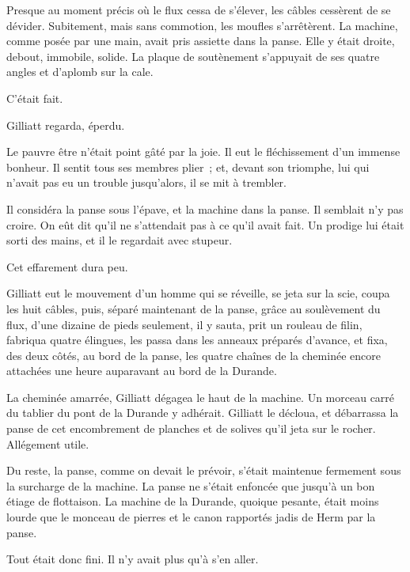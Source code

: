 \documentclass[french,twoside]{book} %
\begin{document}
Presque au moment précis où le flux cessa de s’élever, les câbles cessèrent de se dévider. Subitement, mais sans commotion, les moufles s’arrêtèrent. La machine, comme posée par une main, avait pris assiette dans la panse. Elle y était droite, debout, immobile, solide. La plaque de soutènement s’appuyait de ses quatre angles et d’aplomb sur la cale.\par
 C’était fait.\par
Gilliatt regarda, éperdu.\par
Le pauvre être n’était point gâté par la joie. Il eut le fléchissement d’un immense bonheur. Il sentit tous ses membres plier ; et, devant son triomphe, lui qui n’avait pas eu un trouble jusqu’alors, il se mit à trembler.\par
Il considéra la panse sous l’épave, et la machine dans la panse. Il semblait n’y pas croire. On eût dit qu’il ne s’attendait pas à ce qu’il avait fait. Un prodige lui était sorti des mains, et il le regardait avec stupeur.\par
Cet effarement dura peu.\par
Gilliatt eut le mouvement d’un homme qui se réveille, se jeta sur la scie, coupa les huit câbles, puis, séparé maintenant de la panse, grâce au soulèvement du flux, d’une dizaine de pieds seulement, il y sauta, prit un rouleau de filin, fabriqua quatre élingues, les passa dans les anneaux préparés d’avance, et fixa, des deux côtés, au bord de la panse, les quatre chaînes de la cheminée encore attachées une heure auparavant au bord de la Durande.\par
La cheminée amarrée, Gilliatt dégagea le haut de la machine. Un morceau carré du tablier du pont de la Durande y adhérait. Gilliatt le décloua, et débarrassa la panse de cet encombrement de planches et de solives qu’il jeta sur le rocher. Allégement utile.\par
Du reste, la panse, comme on devait le prévoir, s’était maintenue fermement sous la surcharge de la machine. La panse ne s’était enfoncée que jusqu’à un  bon étiage de flottaison. La machine de la Durande, quoique pesante, était moins lourde que le monceau de pierres et le canon rapportés jadis de Herm par la panse.\par
Tout était donc fini. Il n’y avait plus qu’à s’en aller.
\end{document}

